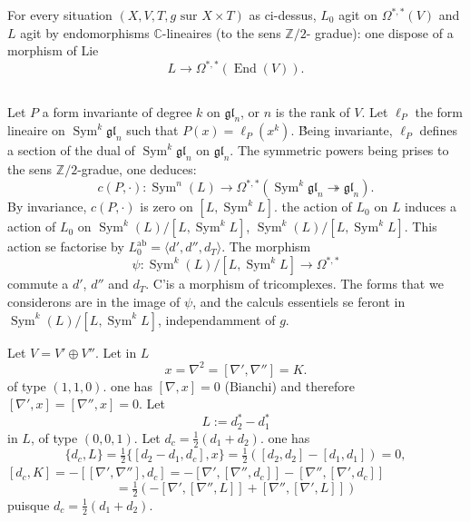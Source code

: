 \documentclass[12pt,a4paper]{article}
\theoremstyle{plain}
\theoremstyle{definition}
\DeclareMathOperator{\End}{End}
\DeclareMathOperator{\Sym}{Sym}
\newcommand{\ZZ}{\mathbb{Z}}
\newcommand{\CC}{\mathbb{C}}
\begin{document}
For every situation $(X, V, T, g \text{ sur } X \times T)$ as ci-dessus, $L_0$
agit on $\Omega^{*,*}(V)$ and $L$ agit by endomorphisms $\CC$-lineaires (to the sens $\ZZ/2$-
gradue): one dispose of a morphism of Lie
\[
L \longrightarrow \Omega^{*,*}(\End(V)) .
\]

\subsection{}

Let $P$ a form invariante of degree $k$ on $\mathfrak{gl}_n$, or $n$ is the rank of
$V$. Let $\ell_P$ the form lineaire on $\Sym^k \mathfrak{gl}_n$ such that $P(x) = \ell_P(x^k)$. \'Being
invariante, $\ell_P$ defines a section of the dual of $\Sym^k \mathfrak{gl}_n$ on $\mathfrak{gl}_n$. The symmetric powers being prises to the sens $\ZZ/2$-gradue, one deduces:
\[
c(P, \cdot): \Sym^n(L) \longrightarrow \Omega^{*,*}(\Sym^k \mathfrak{gl}_n \twoheadrightarrow \mathfrak{gl}_n) .
\]
By invariance, $c(P, \cdot)$ is zero on $[L, \Sym^k L]$. the action of $L_0$ on $L$
induces a action of $L_0$ on $\Sym^k(L)/[L, \Sym^k L]$, $\Sym^k(L)/[L, \Sym^k L]$. This action se factorise
by $L_0^{\text{ab}} = \langle d', d'', d_T \rangle$. The morphism
\[
\psi: \Sym^k(L)/[L, \Sym^k L] \to \Omega^{*,*}
\]
commute a $d'$, $d''$ and $d_T$. C'is a morphism of tricomplexes. The forms that
we considerons are in the image of $\psi$, and the calculs essentiels se feront
in $\Sym^k(L)/[L, \Sym^k L]$, independamment of $g$.

Let $V = V' \oplus V''$. Let in $L$
\[
x = \nabla^2 = [\nabla', \nabla''] = K .
\]
of type $(1,1,0)$. one has $[\nabla, x] = 0$ ($\text{Bianchi}$) and therefore $[\nabla', x] = [\nabla'', x] = 0$.
Let
\[
L := d_2^* - d_1^*
\]
in $L$, of type $(0,0,1)$. Let $d_c = \frac{1}{2}(d_1 + d_2)$. one has
\[
\{d_c, L\} = \tfrac{1}{2}\{[d_2 - d_1, d_c], x\} = \tfrac{1}{2}([d_2, d_2] - [d_1, d_1]) = 0,
\]
$[d_c, K] = -[[\nabla', \nabla''], d_c] = -[\nabla', [\nabla'', d_c]] - [\nabla'', [\nabla', d_c]]$
\[
= \tfrac{1}{2}(-[\nabla', [\nabla'', L]] + [\nabla'', [\nabla', L]])
\]
puisque $d_c = \frac{1}{2}(d_1 + d_2)$.
\end{document}
